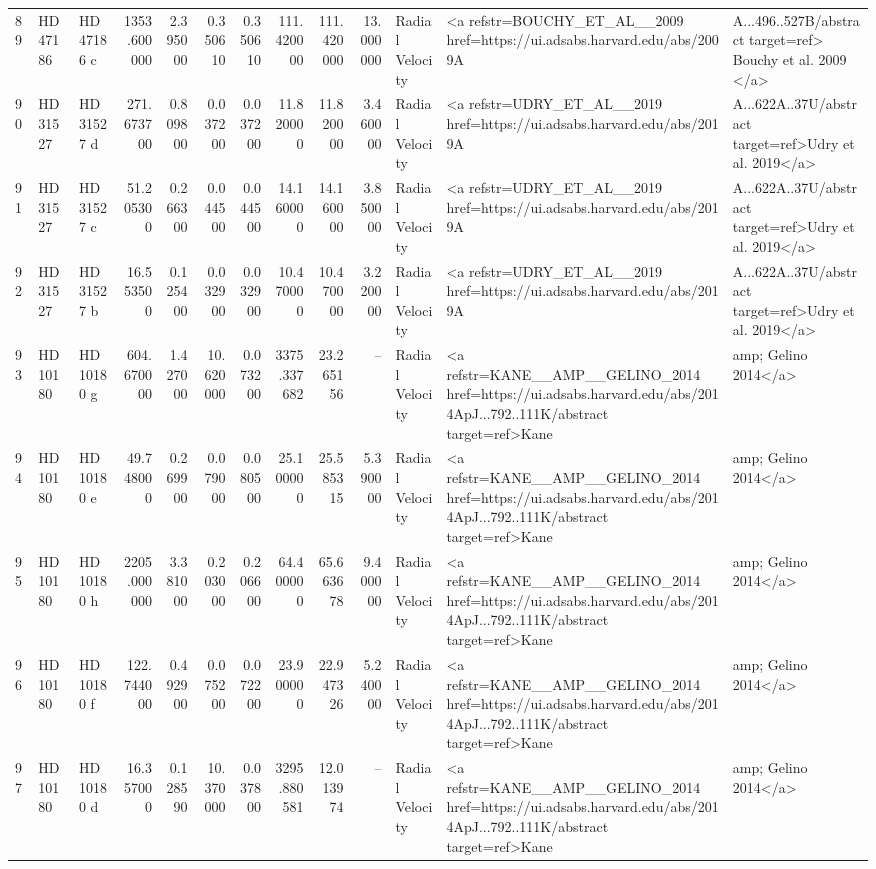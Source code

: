 \begin{tabular}{lllrrrrrrrll}
89 & HD 47186 & HD 47186 c & 1353.600000 & 2.395000 & 0.350610 & 0.350610 & 111.420000 & 111.420000 & 13.000000 & Radial Velocity & <a refstr=BOUCHY_ET_AL__2009 href=https://ui.adsabs.harvard.edu/abs/2009A&A...496..527B/abstract target=ref> Bouchy et al. 2009 </a> \\
90 & HD 31527 & HD 31527 d & 271.673700 & 0.809800 & 0.037200 & 0.037200 & 11.820000 & 11.820000 & 3.460000 & Radial Velocity & <a refstr=UDRY_ET_AL__2019 href=https://ui.adsabs.harvard.edu/abs/2019A&A...622A..37U/abstract target=ref>Udry et al. 2019</a> \\
91 & HD 31527 & HD 31527 c & 51.205300 & 0.266300 & 0.044500 & 0.044500 & 14.160000 & 14.160000 & 3.850000 & Radial Velocity & <a refstr=UDRY_ET_AL__2019 href=https://ui.adsabs.harvard.edu/abs/2019A&A...622A..37U/abstract target=ref>Udry et al. 2019</a> \\
92 & HD 31527 & HD 31527 b & 16.553500 & 0.125400 & 0.032900 & 0.032900 & 10.470000 & 10.470000 & 3.220000 & Radial Velocity & <a refstr=UDRY_ET_AL__2019 href=https://ui.adsabs.harvard.edu/abs/2019A&A...622A..37U/abstract target=ref>Udry et al. 2019</a> \\
93 & HD 10180 & HD 10180 g & 604.670000 & 1.427000 & 10.620000 & 0.073200 & 3375.337682 & 23.265156 & -- & Radial Velocity & <a refstr=KANE__AMP__GELINO_2014 href=https://ui.adsabs.harvard.edu/abs/2014ApJ...792..111K/abstract target=ref>Kane &amp; Gelino 2014</a> \\
94 & HD 10180 & HD 10180 e & 49.748000 & 0.269900 & 0.079000 & 0.080500 & 25.100000 & 25.585315 & 5.390000 & Radial Velocity & <a refstr=KANE__AMP__GELINO_2014 href=https://ui.adsabs.harvard.edu/abs/2014ApJ...792..111K/abstract target=ref>Kane &amp; Gelino 2014</a> \\
95 & HD 10180 & HD 10180 h & 2205.000000 & 3.381000 & 0.203000 & 0.206600 & 64.400000 & 65.663678 & 9.400000 & Radial Velocity & <a refstr=KANE__AMP__GELINO_2014 href=https://ui.adsabs.harvard.edu/abs/2014ApJ...792..111K/abstract target=ref>Kane &amp; Gelino 2014</a> \\
96 & HD 10180 & HD 10180 f & 122.744000 & 0.492900 & 0.075200 & 0.072200 & 23.900000 & 22.947326 & 5.240000 & Radial Velocity & <a refstr=KANE__AMP__GELINO_2014 href=https://ui.adsabs.harvard.edu/abs/2014ApJ...792..111K/abstract target=ref>Kane &amp; Gelino 2014</a> \\
97 & HD 10180 & HD 10180 d & 16.357000 & 0.128590 & 10.370000 & 0.037800 & 3295.880581 & 12.013974 & -- & Radial Velocity & <a refstr=KANE__AMP__GELINO_2014 href=https://ui.adsabs.harvard.edu/abs/2014ApJ...792..111K/abstract target=ref>Kane &amp; Gelino 2014</a> \\

\end{tabular}
